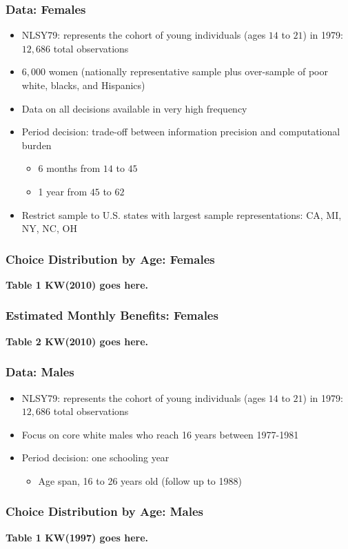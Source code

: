 \begin{frame}
	\frametitle{Data: Females}
		\begin{itemize}
			\item NLSY79: represents the cohort of young individuals (ages $14$ to $21$) in 1979: $12,686$ total observations 
			\item $6,000$ women (nationally representative sample plus over-sample of poor white, blacks, and Hispanics)
			\item Data on all decisions available in very high frequency
			\item Period decision: trade-off between information precision and computational burden
			\begin{itemize}
				\item 6 months from $14$ to $45$
				\item 1 year from $45$ to $62$
			\end{itemize}						
			\item Restrict sample to U.S. states with largest sample representations: CA, MI, NY, NC, OH
		\end{itemize}
\end{frame}

\begin{frame}
	\frametitle{Choice Distribution by Age: Females}
	\textbf{Table 1 KW(2010) goes here.}
\end{frame}

\begin{frame}
	\frametitle{Estimated Monthly Benefits: Females}
	\textbf{Table 2 KW(2010) goes here.}
\end{frame}

\begin{frame}
	\frametitle{Data: Males}
		\begin{itemize}
			\item NLSY79: represents the cohort of young individuals (ages $14$ to $21$) in 1979: $12,686$ total observations
			\item Focus on core white males who reach 16 years between 1977-1981
			\item Period decision: one schooling year
			\begin{itemize}
				\item Age span, 16 to 26 years old (follow up to 1988)
			\end{itemize}						
		\end{itemize}
\end{frame}

\begin{frame}
	\frametitle{Choice Distribution by Age: Males}
	\textbf{Table 1 KW(1997) goes here.}
\end{frame}

